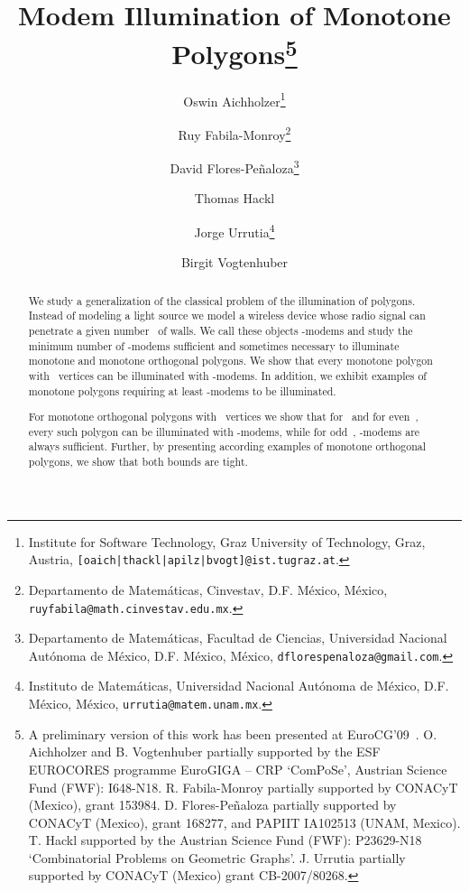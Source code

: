 \documentclass[A4]{article}
\begin{document}
\title{Modem Illumination of Monotone Polygons\thanks{A preliminary version of this work has been presented at EuroCG'09~\cite{Aich}.\newline
O. Aichholzer and B. Vogtenhuber partially supported by the ESF EUROCORES programme EuroGIGA -- CRP `ComPoSe', Austrian Science Fund (FWF): I648-N18. R. Fabila-Monroy partially supported by CONACyT (Mexico), grant 153984. D. Flores-Pe\~naloza partially supported by CONACyT (Mexico), grant 168277, and PAPIIT IA102513 (UNAM, Mexico). T. Hackl supported by the Austrian Science Fund (FWF): P23629-N18 `Combinatorial Problems on Geometric Graphs'. J. Urrutia partially supported by CONACyT (Mexico) grant CB-2007/80268.
  }
 }


\author{Oswin Aichholzer\thanks{Institute for Software Technology, Graz University of Technology, Graz, Austria, \texttt{[oaich|thackl|apilz|bvogt]@ist.tugraz.at}.}
\and Ruy Fabila-Monroy\thanks{Departamento de Matem\'aticas, Cinvestav, D.F. M\'exico, M\'exico, \texttt{ruyfabila@math.cinvestav.edu.mx}.}
\and David Flores-Pe\~naloza\thanks{Departamento de Matem\'aticas, Facultad de Ciencias, Universidad Nacional Aut\'onoma de M\'exico, D.F. M\'exico, M\'exico, \texttt{dflorespenaloza@gmail.com}.}
\and Thomas Hackl
\and Jorge Urrutia\thanks{Instituto de Matem\'aticas, Universidad Nacional Aut\'onoma de M\'exico, D.F. M\'exico, M\'exico, \texttt{urrutia@matem.unam.mx}.}
\and Birgit Vogtenhuber
}


\maketitle


\begin{abstract}
  We study a generalization of the classical problem of the illumination of polygons.
  Instead of modeling a light source we model a wireless device whose radio signal can penetrate a given number~ of walls.
  We call these objects \mbox{-modems} and study the minimum number of \mbox{-modems} sufficient and sometimes necessary to illuminate monotone and monotone orthogonal polygons.
  We show that every monotone polygon with~ vertices can be illuminated with  \mbox{-modems}.
  In addition, we exhibit examples of monotone polygons requiring at least  \mbox{-modems} to be illuminated.

  For monotone orthogonal polygons with~ vertices we show that for~ and for even~, every such polygon can be illuminated with  \mbox{-modems}, while for odd~,  -modems are always sufficient.
  Further, by presenting according examples of monotone orthogonal polygons, we show that both bounds are tight.
\end{abstract}
\end{document}

